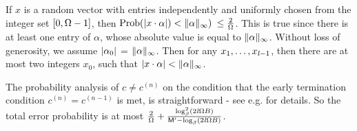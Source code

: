 If $x$ is a random vector with entries 
independently and uniformly chosen from the integer set $[0, \Omega-1]$,
then $\mbox{Prob} (|x \cdot \alpha|) < \|\alpha\|_\infty)$
$\leq \frac{2}{\Omega}$.
This is true since
there is at least one entry of $\alpha$, whose absolute value is
equal to $\|\alpha\|_\infty$.
Without loss of generosity, we assume $|\alpha_0|$ = $\|\alpha\|_\infty$.
Then for any $x_1, \ldots, x_{\mathit l-1}$, then there are at most two integers $x_0$, 
such that $|x \cdot \alpha| < \|\alpha\|_\infty$.

The probability analysis of $c \not= c^{(n)}$ 
on the condition that the early termination condition $c^{(n)} = c^{(n-1)}$ is met,
is straightforward - see e.g. \cite[Theorem 1.]{Kaltofen02} for details.
So the total error probability is at most 
$\frac{2}{\Omega} +
\frac{\log^2_{\beta}(2\mathit l \Omega B)}
{\mathsf M^\prime - \log_{\beta}(2\mathit l \Omega B)}$.
%
%
%
%
%
\QED
